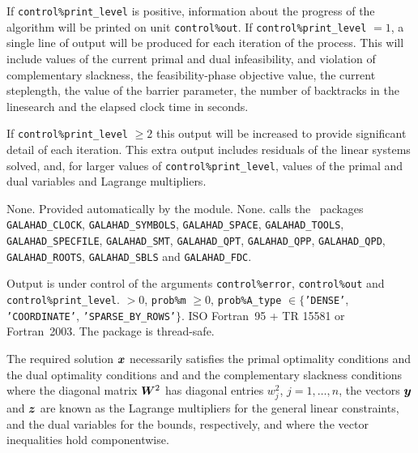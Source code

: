 \documentclass{galahad}
\newcommand{\packagename}{LSQP}
\begin{document}

\galinfo
If {\tt control\%print\_level} is positive, information about the progress 
of the algorithm will be printed on unit {\tt control\-\%out}.
If {\tt control\%print\_level} $= 1$, a single line of output will be produced 
for each iteration of the process. 
This will include values of the current primal and dual infeasibility, and
violation of complementary slackness, the feasibility-phase objective value,
the current steplength, the value of the barrier parameter, the
number of backtracks in the linesearch and the elapsed clock time in seconds.

If {\tt control\%print\_level} $\geq 2$ this 
output will be increased to provide significant detail of each iteration. 
This extra output includes residuals of the linear systems solved, and,
for larger values of {\tt control\%print\_level}, values of the primal and dual
variables and Lagrange multipliers. 


\galgeneral

\galcommon None.
\galworkspace Provided automatically by the module.
\galroutines None. 
\galmodules {\tt \packagename\_solve} calls the \galahad\ packages
\sloppy
{\tt GALAHAD\_\-CLOCK},
{\tt GALAHAD\_SY\-M\-BOLS}, 
{\tt GALAHAD\_SPACE}, 
{\tt GALAHAD\_TOOLS}, 
{\tt GALAHAD\_SPECFILE}, 
{\tt GALAHAD\_SMT}, 
{\tt GALAHAD\_QPT}, 
{\tt GALAHAD\_QPP}, 
{\tt GALAHAD\_QPD}, 
{\tt GALAHAD\_ROOTS}, 
{\tt GALAHAD\_SBLS}
and
{\tt GALAHAD\_FDC}.

\galio Output is under control of the arguments
 {\tt control\%error}, {\tt control\%out} and {\tt control\%print\_level}.
 $> 0$, {\tt prob\%m} $\geq  0$, 
{\tt prob\%A\_type} $\in \{${\tt 'DENSE'}, 
 {\tt 'COORDINATE'}, {\tt 'SPARSE\_BY\_ROWS'}$\}$. 
\galportability ISO Fortran~95 + TR 15581 or Fortran~2003. 
The package is thread-safe.


\galmethod
The required solution ${\bm{x}}$ necessarily satisfies 
the primal optimality conditions
and 
the dual optimality conditions
and 
and the complementary slackness conditions 
where the diagonal matrix ${\bm{W}}^{2}$ has diagonal entries $w_{j}^{2}$,
$j = 1, \ldots ,n$, the vectors ${\bm{y}}$ and ${\bm{z}}$ are 
known as the Lagrange multipliers for
the general linear constraints, and the dual variables for the bounds,
respectively, and where the vector inequalities hold componentwise.
\end{document}
